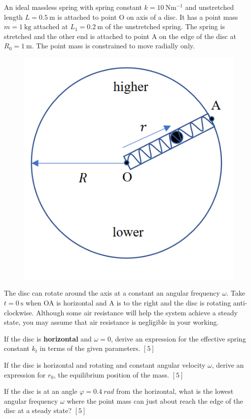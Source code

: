 \begin{problem}
    An ideal massless spring with spring constant $k = \qty{10}{\N \m^{-1}}$ and unstretched length $L = \qty{0.5}{\m}$ is attached to point O on axis of a disc. It has a point mass $m = \qty{1}{\kg}$ attached at $L_1 = \qty{0.2}{\m}$ of the unstretched spring. The spring is stretched and the other end is attached to point A on the edge of the disc at $R_0 = \qty{1}{\m}$. The point mass is constrained to move radially only.
    \begin{figure}[H]
        \centering
        \includegraphics{spho_book_TYS_images/2021SPhO_9.png}
    \end{figure}
    The disc can rotate around the axis at a constant an angular frequency $\omega$. Take $t = \qty{0}{\s}$ when OA is horizontal and A is to the right and the disc is rotating anti-clockwise. Although some air resistance will help the system achieve a steady state, you may assume that air resistance is negligible in your working.
    \begin{subproblemalph}
        \item If the disc is \textbf{horizontal} and $\omega = 0$, derive an expression for the effective spring constant $k_t$ in terms of the given parameters. \hfill $[5]$
        \item If the disc is horizontal and rotating and constant angular velocity $\omega$, derive an expression for $r_0$, the equilibrium position of the mass. \hfill $[5]$
        \item If the disc is at an angle $\varphi = \qty{0.4}{rad}$ from the horizontal, what is the lowest angular frequency $\omega$ where the point mass can just about reach the edge of the disc at a steady state? \hfill $[5]$
    \end{subproblemalph}
\end{problem}
